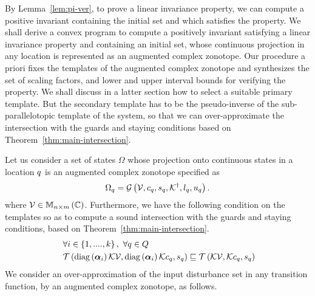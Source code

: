 By Lemma~\ref{lem:pi-ver}, to prove a linear invariance property, we
can compute a positive invariant containing the initial set and which
satisfies the property.  We shall derive a convex program to compute a
positively invariant satisfying a linear invariance property and
containing an initial set, whose continuous projection in any location
is represented as an augmented complex zonotope.  Our procedure
a priori fixes the templates of the augmented complex zonotope and
synthesizes the set of scaling factors, and lower and upper interval
bounds for verifying the property.  We shall discuss in a latter
section how to select a suitable primary template.  But the secondary
template has to be the pseudo-inverse of the sub-parallelotopic
template of the system, so that we can over-approximate the
intersection with the guards and staying conditions based on
Theorem~\ref{thm:main-intersection}.

Let us consider a set of states $\Omega$ whose projection onto
continuous states in a location $q$ is an augmented complex
zonotope specified as
%
\[
\Omega_q=\mathcal{G}\left(\mathcal{V},c_q,s_q,{\mathcal{K}}^\dagger,l_q,u_q\right).
\]
%
where $\mathcal{V}\in\mathbb{M}_{n\times m}\left(\mathbb{C}\right)$.  Furthermore, we have the
following condition on the templates so as to compute a sound
intersection with the guards and staying conditions, based on
Theorem~\ref{thm:main-intersection}.
%
\begin{equation}~\label{eqn:boxcenter}
\begin{split}
 & \forall
 i\in\left\{1,....,k\right\},~\forall q\in Q\\
 & \mathit{\operatorname{\mathcal{T}}}\left(\operatorname{diag}\left(\bm{\alpha}_{i}\right)\mathcal{K}\mathcal{V},\operatorname{diag}\left(\bm{\alpha}_{i}\right)\mathcal{K}c_q,s_q\right)\sqsubseteq\mathit{\operatorname{\mathcal{T}}}\left(\mathcal{K}\mathcal{V},\mathcal{K}c_q,s_q\right)
 \end{split}
\end{equation}
%
We consider an
over-approximation of the input
disturbance set in any transition function, by an
augmented complex zonotope, as follows.

